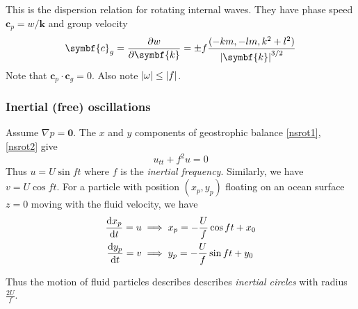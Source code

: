 \documentclass{jknotes}
\begin{document}
\begin{center}
\end{center}

This is the dispersion relation for rotating internal waves. They have phase
speed $\symbf{c}_p = w/\symbf{k}$ and group velocity 
\begin{equation}
	\symbf{c}_g = \frac{\partial w}{\partial \symbf{k}} = \pm f \frac{(-km, -lm, k^2
		+ l^2)}{\abs{\symbf{k}}^{3/2}}
\end{equation}
Note that $\symbf{c}_p\cdot\symbf{c}_g = 0$. Also note $\abs{\omega} \le \abs{f}$.

\subsubsection{Inertial (free) oscillations}
Assume $\nabla p = \symbf{0}$.  The $x$ and $y$ components of geostrophic balance
\eqref{nsrot1}, \eqref{nsrot2} give
\begin{equation}
	u_{tt} + f^2 u = 0
\end{equation}
Thus $u = U \sin ft$ where $f$ is the \emph{inertial frequency}. Similarly, we
have $v = U \cos ft$. For a particle with position $(x_p, y_p)$ floating on an
ocean surface $z=0$ moving with the fluid velocity, we have
\begin{equation}
	\begin{aligned}
		\frac{\diffd x_p}{\diffd t} = u &\implies x_p = -\frac{U}{f} \cos ft +
		x_0 \\
		\frac{\diffd y_p}{\diffd t} = v &\implies y_p = -\frac{U}{f} \sin ft +
		y_0
	\end{aligned}
\end{equation}

Thus the motion of fluid particles describes describes \emph{inertial circles}
with radius $\frac{2U}{f}$.
\end{document}
